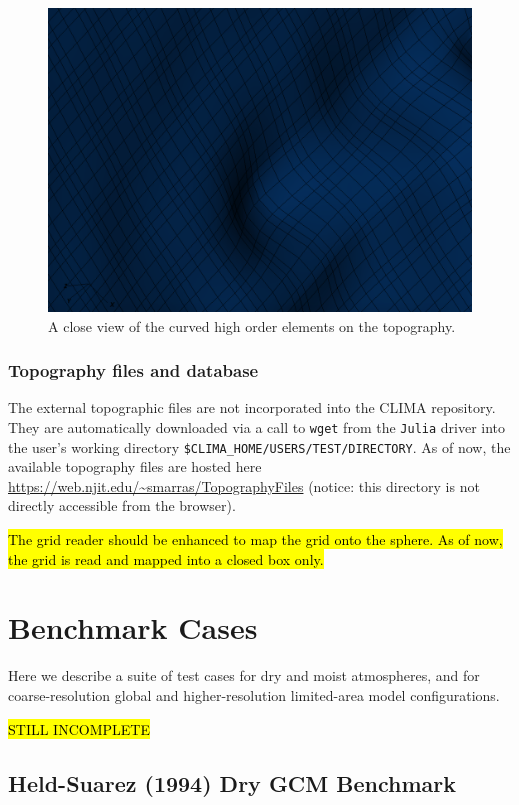 \documentclass{report}
\begin{document}
{\begin{figure}[htbp]
\centering
\includegraphics[width=\textwidth]{figures/GRID-detail.png}
\caption{A close view of the curved high order elements on the topography.}
\label{fig:gridDetailView}
\end{figure}

\subsection{Topography files and database}
The external topographic files are not incorporated into the CLIMA repository. 
They are automatically downloaded via a call to {\tt wget} from the {\tt Julia} driver into the user's working directory {\tt \$CLIMA\_HOME/USERS/TEST/DIRECTORY}. As of now, the available topography files are hosted here \url{https://web.njit.edu/~smarras/TopographyFiles} (notice: this directory is not directly accessible from the browser).

\hl{The grid reader should be enhanced to map the grid onto the sphere. As of now, the grid is read and mapped into a closed box only.}

\chapter{Benchmark Cases}

Here we describe a suite of test cases for dry and moist atmospheres, and for coarse-resolution global and higher-resolution limited-area model configurations. 

\hl{STILL INCOMPLETE}

\section{Held-Suarez (1994) Dry GCM Benchmark}

}
\end{document}
